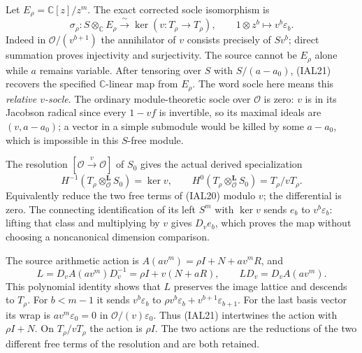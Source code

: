 \documentclass[11pt,a4paper]{article}
\theoremstyle{definition}
\begin{document}
Let $E_\rho=\mathbb C[z]/z^m$.  The exact corrected socle isomorphism is
\begin{equation}
 \sigma_\rho:S\otimes_{\mathbb C}E_\rho
       \xrightarrow{\ \sim\ }\ker(v:T_\rho\to T_\rho),
 \qquad 1\otimes z^b\longmapsto v^b\varepsilon_b.    \tag{IAL21}
\end{equation}
Indeed in $\mathcal O/(v^{b+1})$ the annihilator of $v$ consists precisely
of $S v^b$; direct summation proves injectivity and surjectivity.
The source cannot be $E_\rho$ alone while $a$ remains variable.
After tensoring over $S$ with $S/(a-a_0)$, (IAL21) recovers the
specified $\mathbb C$-linear map from $E_\rho$.
The word socle here means this \emph{relative $v$-socle}.  The ordinary
module-theoretic socle over $\mathcal O$ is zero: $v$ is in its
Jacobson radical since every $1-vf$ is invertible, so its maximal
ideals are $(v,a-a_0)$; a vector in a simple submodule would be killed
by some $a-a_0$, which is impossible in this $S$-free module.

The resolution $[\mathcal O\xrightarrow{v}\mathcal O]$ of $S_0$ gives
the actual derived specialization
\begin{equation}
 H^{-1}(T_\rho\otimes^{\mathbf L}_{\mathcal O}S_0)=\ker v,
 \qquad H^0(T_\rho\otimes^{\mathbf L}_{\mathcal O}S_0)=T_\rho/vT_\rho.
                                                        \tag{IAL22}
\end{equation}
Equivalently reduce the two free terms of (IAL20) modulo $v$; the
differential is zero.  The connecting identification of its left
$S^m$ with $\ker v$ sends $e_b$ to $v^b\varepsilon_b$: lifting that
class and multiplying by $v$ gives $D_v e_b$, which proves the map
without choosing a noncanonical dimension comparison.

The source arithmetic action is $A(av^m)=\rho I+N+av^mR$, and
\begin{equation}
 L=D_vA(av^m)D_v^{-1}=\rho I+v(N+aR),\qquad
 LD_v=D_vA(av^m).                                    \tag{IAL23}
\end{equation}
This polynomial identity shows that $L$ preserves the image lattice
and descends to $T_\rho$.  For $b<m-1$ it sends
$v^b\varepsilon_b$ to
$\rho v^b\varepsilon_b+v^{b+1}\varepsilon_{b+1}$.
For the last basis vector its wrap is $av^m\varepsilon_0=0$ in
$\mathcal O/(v)\varepsilon_0$.  Thus (IAL21) intertwines the action
with $\rho I+N$.  On $T_\rho/vT_\rho$ the action is $\rho I$.
The two actions are the reductions of the two different free terms
of the resolution and are both retained.
\end{document}
